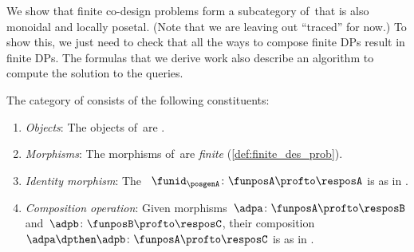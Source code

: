We show that finite co-design problems form a subcategory of~\DP that is also monoidal and locally posetal.
(Note that we are leaving out ``traced'' for now.) To show this, we just need to check that all the ways to compose finite DPs result in finite DPs.
The formulas that we derive work also describe an algorithm to compute the solution to the queries.
\begin{definition}
    \label{def:DPfinite}
    The category of  \DPfinite consists of the following constituents:
    \begin{enumerate}
        \item \emph{Objects}: The objects of~\DP are .
        \item \emph{Morphisms}: The morphisms of~\DP are \emph{finite}  (\cref{def:finite_des_prob}).
        \item \emph{Identity morphism}: The ~$\funid_\posgenA \colon \funposA \profto \resposA$ is as in \DP.
        \item \emph{Composition operation}: Given morphisms~$\adpa \colon  \funposA \profto \resposB$ and~$\adpb \colon \funposB \profto \resposC$, their composition~$\adpa \dpthen \adpb\colon \funposA\profto \resposC$ is as in \DP.
    \end{enumerate}
\end{definition}
